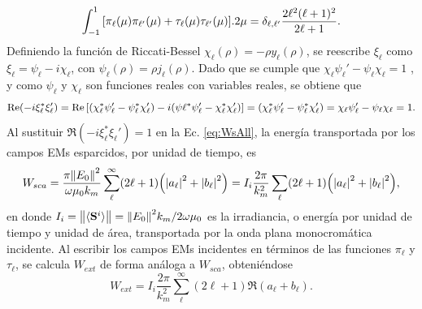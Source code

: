 %
	\begin{equation*}
	 \int_{-1}^{1}\qty[\pi_\ell(\mu)\pi_{\ell'}(\mu) + \tau_\ell(\mu)\tau_{\ell'}(\mu)].2\mu
 			= \delta_{\ell,\ell'} \frac{2\ell^2(\ell+1)^2}{2\ell+1}.
	 \end{equation*} 
%
Definiendo la función de Riccati-Bessel $\chi_\ell (\rho) = -\rho y_\ell(\rho)$, se reescribe $\xi_\ell$ como $\xi_\ell= \psi_\ell-i\chi_\ell$, con $\psi_\ell(\rho) = \rho j_\ell(\rho)$. Dado que se cumple que $\chi_\ell\psi_\ell'-\psi_\ell\chi_\ell = 1$ \cite{bohren1998absorption}, y como $\psi_\ell$ y $\chi_\ell$ son funciones reales con variables reales, se obtiene que 
%
\begin{equation*}
\Re(-i\xi_\ell^*\xi_\ell')=\Re\qty[(\chi_\ell^*\psi_\ell'-\psi_\ell^*\chi_\ell')
						-i(\psi\ell^*\psi_\ell'-\chi_\ell^*\chi_\ell') ] 
						= (\chi_\ell^*\psi_\ell'-\psi_\ell^*\chi_\ell') 
						= \chi_\ell\psi_\ell'-\psi_\ell\chi_\ell = 1.
\end{equation*}
%
Al sustituir $\Re(-i\xi_\ell^*\xi_\ell') = 1$ en la Ec. \eqref{eq:WsAll}, la energía transportada por los campos EMs esparcidos, por unidad de tiempo, es
%
\begin{equation}
W_{sca} = \frac{\pi\norm{E_0}^2}{\omega\mu_0 k_m}
		\sum_\ell^\infty (2\ell+1) \qty(\abs{a_\ell}^2+\abs{b_\ell}^2) = I_i \frac{2\pi}{k_m^2}  \sum_\ell (2\ell+1) \qty(\abs{a_\ell}^2+\abs{b_\ell}^2),
\end{equation}
%
en donde $I_i = \norm{\langle\vb{S}^i\rangle} = \norm{E_0}^2k_m/2\omega\mu_0$ es la irradiancia, o energía por unidad de tiempo y unidad de área, transportada por la onda plana monocromática incidente. Al escribir los campos EMs incidentes en términos de las funciones $\pi_\ell$ y $\tau_\ell$, se calcula $W_{ext}$ de forma análoga a $W_{sca}$, obteniéndose
%
\begin{equation}
W_{ext} = I_i \frac{2\pi}{k_m^2}  \sum_\ell^\infty (2\ell+1) \Re(a_\ell + b_\ell).
\end{equation}
%

